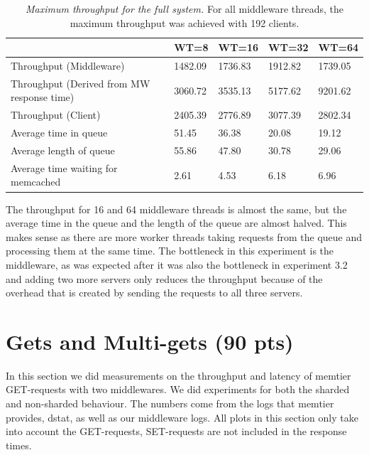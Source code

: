 \documentclass[11pt,a4paper]{article}
\begin{document}
\begin{table}[H]
	\centering
	\begin{tabular}{|l|p{1.5cm}|p{1.5cm}|p{1.5cm}|p{1.5cm}|}
		\hline                                            										& WT=8 		& WT=16 		& WT=32 		& WT=64 \\ 
		\hline Throughput (Middleware)                    					& 1482.09	 	& 1736.83	     & 1912.82    	& 1739.05      \\ 
		\hline Throughput (Derived from MW response time) 	& 3060.72    & 3535.13  	& 5177.62   	& 9201.62     \\ 
		\hline Throughput (Client)                        						& 2405.39  	& 2776.89   	& 3077.39   	& 2802.34       \\ 
		\hline Average time in queue                     						& 51.45     	& 36.38     	& 20.08      	& 19.12      \\ 
		\hline Average length of queue                    					& 55.86     	& 47.80      	& 30.78      	& 29.06      \\ 
		\hline Average time waiting for memcached         			& 2.61    		& 4.53      		& 6.18      		& 6.96      \\ 
		\hline 
	\end{tabular}
	\caption{\textit{Maximum throughput for the full system.} For all middleware threads, the maximum throughput was achieved with 192 clients. }
	\label{Table:4_table}
\end{table}

The throughput for 16 and 64 middleware threads is almost the same, but the average time in the queue and the length of the queue are almost halved. This makes sense as there are more worker threads taking requests from the queue and processing them at the same time. The bottleneck in this experiment is the middleware, as was expected after it was also the bottleneck in experiment 3.2 and adding two more servers only reduces the throughput because of the overhead that is created by sending the requests to all three servers.

\section{Gets and Multi-gets (90 pts)}

In this section we did measurements on the throughput and latency of memtier GET-requests with two middlewares. We did experiments for both the sharded and non-sharded behaviour. The numbers come from the logs that memtier provides, dstat, as well as our middleware logs. All plots in this section only take into account the GET-requests, SET-requests are not included in the response times.
\end{document}
